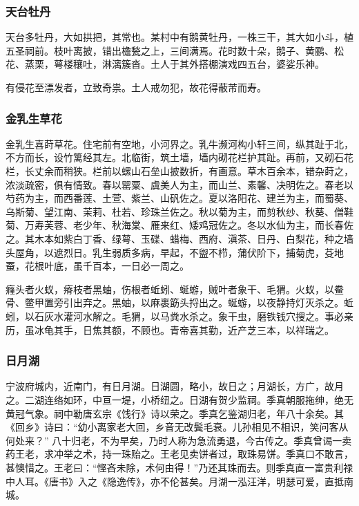 \documentclass[]{article}
\begin{document}
\hypertarget{header-n28}{%
\subsubsection{天台牡丹}\label{header-n28}}

天台多牡丹，大如拱把，其常也。某村中有鹅黄牡丹，一株三干，其大如小斗，植五圣祠前。枝叶离披，错出檐甃之上，三间满焉。花时数十朵，鹅子、黄鹂、松花、蒸栗，萼楼穰吐，淋漓簇沓。土人于其外搭棚演戏四五台，婆娑乐神。

有侵花至漂发者，立致奇祟。土人戒勿犯，故花得蔽芾而寿。

\hypertarget{header-n34}{%
\subsubsection{金乳生草花}\label{header-n34}}

金乳生喜莳草花。住宅前有空地，小河界之。乳牛濒河构小轩三间，纵其趾于北，不方而长，设竹篱经其左。北临街，筑土墙，墙内砌花栏护其趾。再前，又砌石花栏，长丈余而稍狭。栏前以螺山石垒山披数折，有画意。草木百余本，错杂莳之，浓淡疏密，俱有情致。春以罂粟、虞美人为主，而山兰、素馨、决明佐之。春老以芍药为主，而西番莲、土萱、紫兰、山矾佐之。夏以洛阳花、建兰为主，而蜀葵、乌斯菊、望江南、茉莉、杜若、珍珠兰佐之。秋以菊为主，而剪秋纱、秋葵、僧鞋菊、万寿芙蓉、老少年、秋海棠、雁来红、矮鸡冠佐之。冬以水仙为主，而长春佐之。其木本如紫白丁香、绿萼、玉碟、蜡梅、西府、滇茶、日丹、白梨花，种之墙头屋角，以遮烈日。乳生弱质多病，早起，不盥不栉，蒲伏阶下，捕菊虎，芟地蚕，花根叶底，虽千百本，一日必一周之。

癃头者火蚁，瘠枝者黑蚰，伤根者蚯蚓、蜒蝣，贼叶者象干、毛猬。火蚁，以鲞骨、鳖甲置旁引出弃之。黑蚰，以麻裹筯头捋出之。蜒蝣，以夜静持灯灭杀之。蚯蚓，以石灰水灌河水解之。毛猬，以马粪水杀之。象干虫，磨铁钱穴搜之。事必亲历，虽冰龟其手，日焦其额，不顾也。青帝喜其勤，近产芝三本，以祥瑞之。

\hypertarget{header-n40}{%
\subsubsection{日月湖}\label{header-n40}}

宁波府城内，近南门，有日月湖。日湖圆，略小，故日之；月湖长，方广，故月之。二湖连络如环，中亘一堤，小桥纽之。日湖有贺少监祠。季真朝服拖绅，绝无黄冠气象。祠中勒唐玄宗《饯行》诗以荣之。季真乞鉴湖归老，年八十余矣。其《回乡》诗曰：``幼小离家老大回，乡音无改鬓毛衰。儿孙相见不相识，笑问客从何处来？''
八十归老，不为早矣，乃时人称为急流勇退，今古传之。季真曾谒一卖药王老，求冲举之术，持一珠贻之。王老见卖饼者过，取珠易饼。季真口不敢言，甚懊惜之。王老曰：``悭吝未除，术何由得！''乃还其珠而去。则季真直一富贵利禄中人耳。《唐书》入之《隐逸传》，亦不伦甚矣。月湖一泓汪洋，明瑟可爱，直抵南城。
\end{document}
